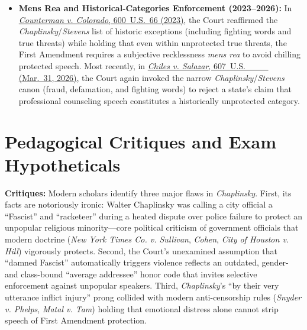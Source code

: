 \documentclass[12pt]{article}
\begin{document}
\begin{itemize}
  \item \textbf{Mens Rea and Historical-Categories Enforcement (2023--2026):} In \href{https://supreme.justia.com/cases/federal/us/600/22-138/}{\textit{Counterman v. Colorado}, 600~U.S.~66 (2023)}, the Court reaffirmed the \textit{Chaplinsky}/\textit{Stevens} list of historic exceptions (including fighting words and true threats) while holding that even within unprotected true threats, the First Amendment requires a subjective recklessness \textit{mens rea} to avoid chilling protected speech. Most recently, in \href{https://supreme.justia.com/cases/federal/us/607/24-539/}{\textit{Chiles v. Salazar}, 607~U.S.~\_\_\_ (Mar.~31, 2026)}, the Court again invoked the narrow \textit{Chaplinsky}/\textit{Stevens} canon (fraud, defamation, and fighting words) to reject a state's claim that professional counseling speech constitutes a historically unprotected category.
\end{itemize}

\section{Pedagogical Critiques and Exam Hypotheticals}
\textbf{Critiques:} Modern scholars identify three major flaws in \textit{Chaplinsky}. First, its facts are notoriously ironic: Walter Chaplinsky was calling a city official a ``Fascist'' and ``racketeer'' during a heated dispute over police failure to protect an unpopular religious minority---core political criticism of government officials that modern doctrine (\textit{New York Times Co. v. Sullivan}, \textit{Cohen}, \textit{City of Houston v. Hill}) vigorously protects. Second, the Court's unexamined assumption that ``damned Fascist'' automatically triggers violence reflects an outdated, gender- and class-bound ``average addressee'' honor code that invites selective enforcement against unpopular speakers. Third, \textit{Chaplinsky}'s ``by their very utterance inflict injury'' prong collided with modern anti-censorship rules (\textit{Snyder v. Phelps}, \textit{Matal v. Tam}) holding that emotional distress alone cannot strip speech of First Amendment protection.
\end{document}
